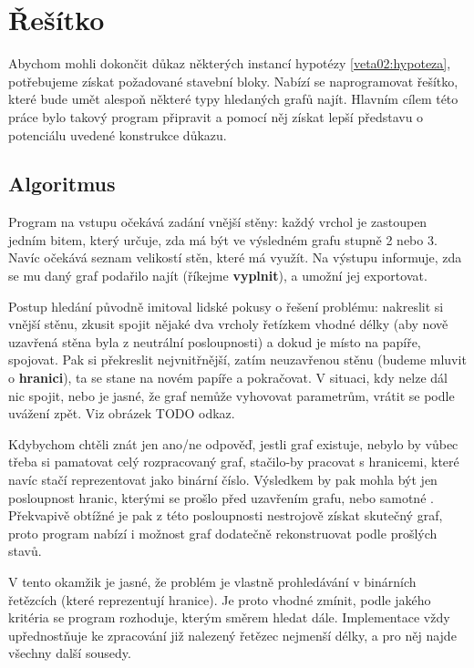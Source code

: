 
\chapter{Řešítko}
Abychom mohli dokončit důkaz některých instancí hypotézy \ref{veta02:hypoteza}, potřebujeme získat požadované stavební bloky. Nabízí se naprogramovat řešítko, které bude umět alespoň některé typy hledaných grafů najít. Hlavním cílem této práce bylo takový program připravit a pomocí něj získat lepší představu o potenciálu uvedené konstrukce důkazu.

\section{Algoritmus}

Program na vstupu očekává zadání vnější stěny: každý vrchol je zastoupen jedním bitem, který určuje, zda má být ve výsledném grafu stupně 2 nebo 3. Navíc očekává seznam velikostí stěn, které má využít. Na výstupu informuje, zda se mu daný graf podařilo najít (říkejme \textbf{vyplnit}), a umožní jej exportovat.

Postup hledání původně imitoval lidské pokusy o řešení problému: nakreslit si vnější stěnu, zkusit spojit nějaké dva vrcholy řetízkem vhodné délky (aby nově uzavřená stěna byla z neutrální posloupnosti) a dokud je místo na papíře, spojovat. Pak si překreslit nejvnitřnější, zatím neuzavřenou stěnu (budeme mluvit o \textbf{hranici}), ta se stane  na novém papíře a pokračovat. V situaci, kdy nelze dál nic spojit, nebo je jasné, že graf nemůže vyhovovat parametrům, vrátit se podle uvážení zpět. Viz obrázek TODO odkaz.

Kdybychom chtěli znát jen ano/ne odpověď, jestli graf existuje, nebylo by vůbec třeba si pamatovat celý rozpracovaný graf, stačilo-by pracovat s hranicemi, které navíc stačí reprezentovat jako binární číslo. Výsledkem by pak mohla být jen posloupnost hranic, kterými se prošlo před uzavřením grafu, nebo samotné . Překvapivě obtížné je pak z této posloupnosti nestrojově získat skutečný graf, proto program nabízí i možnost graf dodatečně rekonstruovat podle prošlých stavů.

V tento okamžik je jasné, že problém je vlastně prohledávání v binárních řetězcích (které reprezentují hranice). Je proto vhodné zmínit, podle jakého kritéria se program rozhoduje, kterým směrem hledat dále. Implementace vždy upřednostňuje ke zpracování již nalezený řetězec nejmenší délky, a pro něj najde všechny další sousedy.

